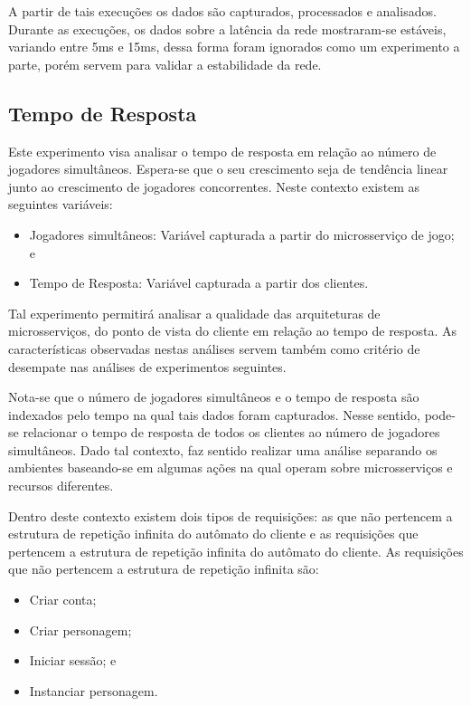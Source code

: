 A partir de tais execuções os dados são capturados, processados e analisados.
%
Durante as execuções, os dados sobre a latência da rede mostraram-se estáveis, variando entre 5ms e 15ms, dessa forma foram ignorados como um experimento a parte, porém servem para validar a estabilidade da rede.

\subsection{Tempo de Resposta}

Este experimento visa analisar o tempo de resposta em relação ao número de jogadores simultâneos.
%
Espera-se que o seu crescimento seja de tendência linear junto ao crescimento de jogadores concorrentes.
%
Neste contexto existem as seguintes variáveis:

\begin{itemize}
    \item Jogadores simultâneos: Variável capturada a partir do microsserviço de jogo; e
    \item Tempo de Resposta: Variável capturada a partir dos clientes.
\end{itemize}

Tal experimento permitirá analisar a qualidade das arquiteturas de microsserviços, do ponto de vista do cliente em relação ao tempo de resposta.
%
As características observadas nestas análises servem também como critério de desempate nas análises de experimentos seguintes.

Nota-se que o número de jogadores simultâneos e o tempo de resposta são indexados pelo tempo na qual tais dados foram capturados.
%
Nesse sentido, pode-se relacionar o tempo de resposta de todos os clientes ao número de jogadores simultâneos.
%
Dado tal contexto, faz sentido realizar uma análise separando os ambientes baseando-se em algumas ações na qual operam sobre microsserviços e recursos diferentes.

Dentro deste contexto existem dois tipos de requisições: as que não pertencem a estrutura de repetição infinita do autômato do cliente e as requisições que pertencem a estrutura de repetição infinita do autômato do cliente.
%
As requisições que não pertencem a estrutura de repetição infinita são:

\begin{itemize}
    \item Criar conta;
    \item Criar personagem;
    \item Iniciar sessão; e
    \item Instanciar personagem.
\end{itemize}

